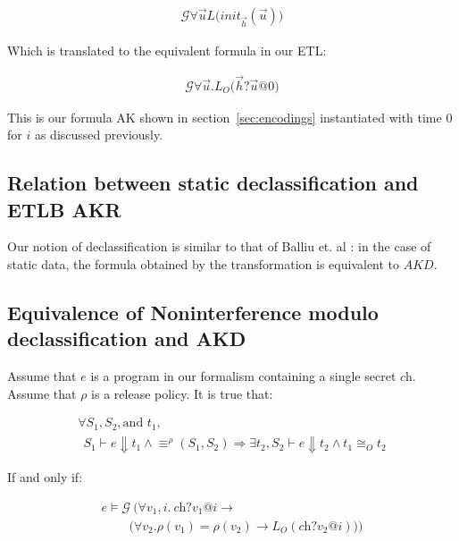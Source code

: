\documentclass[conference]{IEEEtran}
\theoremstyle{definition}
\newcommand{\sch}{\textit{ch}}
\newcommand{\prin}{\textit{O}}
\newcommand{\etlb}{ETLB\xspace}
\newcommand{\tr}{t\xspace}
\newcommand{\talways}{\mathcal{G}}
\begin{document}
\begin{displaymath}
  \begin{array}{c}
    \talways \forall \overrightarrow{u} L
    \big(init_{\overrightarrow{h}}(\overrightarrow{u}) \big)
  \end{array}
\end{displaymath}

Which is translated to the equivalent formula in our ETL:

\begin{displaymath}
  \begin{array}{c}
    \talways \forall \overrightarrow{u}. L_\prin
    \big(\overrightarrow{h}?\overrightarrow{u}@0 \big)
  \end{array}
\end{displaymath}

This is our formula AK shown in section~\ref{sec:encodings}
instantiated with time 0 for $i$ as discussed previously.

\subsection{Relation between static declassification and \etlb AKR}
\label{sec:akr-translation}

Our notion of declassification is similar to that of Balliu et. al
\cite{Balliu:11}: in the case of static data, the formula obtained by
the transformation is equivalent to $AKD$.

\subsection{Equivalence of Noninterference modulo declassification and AKD}

\begin{Theorem}
  Assume that $e$ is a program in our formalism containing a single
  secret $\sch$.  Assume that $\rho$ is a release policy. It is true that:
  
  \begin{displaymath}
    \begin{array}{l}
      \forall S_1, S_2, \text{and~} \tr_1, \\
      ~~ S_1 \vdash e \Downarrow \tr_1 \land \equiv^\rho(S_1,S_2) \Rightarrow \exists \tr_2, S_2
      \vdash e \Downarrow \tr_2
      \land \tr_1 \cong_{\prin} \tr_2
    \end{array}
  \end{displaymath}
    
  If and only if: 

  \begin{displaymath}
    \begin{array}{l}
      e \models \talways ~ \Big( \forall v_1, i. ~ \sch ? v_1 @ i \rightarrow \\
      ~~~~~~~~~~ \big( \forall v_2. \rho(v_1) = \rho(v_2) \rightarrow 
      L_\prin(\sch ? v_2 @ i) \big) \Big)
    \end{array}
  \end{displaymath}

\end{Theorem}
\end{document}
